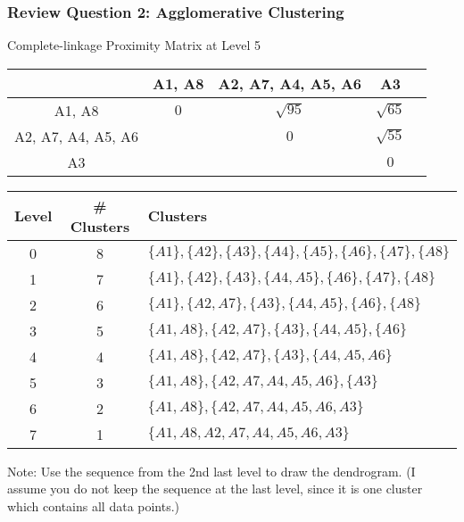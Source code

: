 \documentclass[aspectratio=169, 10pt]{beamer}
\begin{document}
\begin{frame}[t]
\end{frame}

\begin{frame}[t]
    \frametitle{Review Question 2: Agglomerative Clustering}
    \small

    Complete-linkage Proximity Matrix at Level 5

    \begin{table}[]
        \scriptsize
        \begin{tabular}{c|cccc}
        \cellcolor[HTML]{FFFFFF}{\color[HTML]{000000} } & {\color[HTML]{000000} A1, A8} & {\color[HTML]{000000} A2, A7, A4, A5, A6}      & {\color[HTML]{000000} A3}\\ \hline
        {\color[HTML]{000000} A1, A8}                   & {\color[HTML]{000000} $0$}    & {\color[HTML]{000000} $\sqrt{95}$} & {\color[HTML]{000000} $\sqrt{65}$} \\
        {\color[HTML]{000000} A2, A7, A4, A5, A6}                   & {\color[HTML]{000000} }       & {\color[HTML]{000000} $0$}         & {\color[HTML]{fe0000} $\sqrt{55}$} \\
        {\color[HTML]{000000} A3}                       & {\color[HTML]{000000} }       & {\color[HTML]{000000} }            & {\color[HTML]{000000} $0$} \\
        \end{tabular}
    \end{table}

    \begin{table}[]
        \scriptsize
        \begin{tabular}{c|c|l}
        Level & \# Clusters & Clusters \\ \hline
        0     & 8           & $\{A1\}, \{A2\}, \{A3\}, \{A4\}, \{A5\}, \{A6\}, \{A7\}, \{A8\}$\\
        1     & 7           & $\{A1\}, \{A2\}, \{A3\}, \{A4, A5\}, \{A6\}, \{A7\}, \{A8\}$\\
        2     & 6           & $\{A1\}, \{A2, A7\}, \{A3\}, \{A4, A5\}, \{A6\}, \{A8\}$\\
        3     & 5           & $\{A1, A8\}, \{A2, A7\}, \{A3\}, \{A4, A5\}, \{A6\}$\\
        4     & 4           & $\{A1, A8\}, \{A2, A7\}, \{A3\}, \{A4, A5, A6\}$\\
        5     & 3           & $\{A1, A8\}, \{A2, A7, A4, A5, A6\}, \{A3\}$\\
        6     & 2           & {\color[HTML]{3531FF} $\{A1, A8\}, \{A2, A7, A4, A5, A6, A3\}$}\\
        7     & 1           & $\{A1, A8, A2, A7, A4, A5, A6, A3\}$\\
        \end{tabular}
    \end{table}

    Note: Use the sequence from the 2nd last level to draw the dendrogram. (I assume you do not keep the sequence at the last level, since it is one cluster which contains all data points.)

\end{frame}
\end{document}

